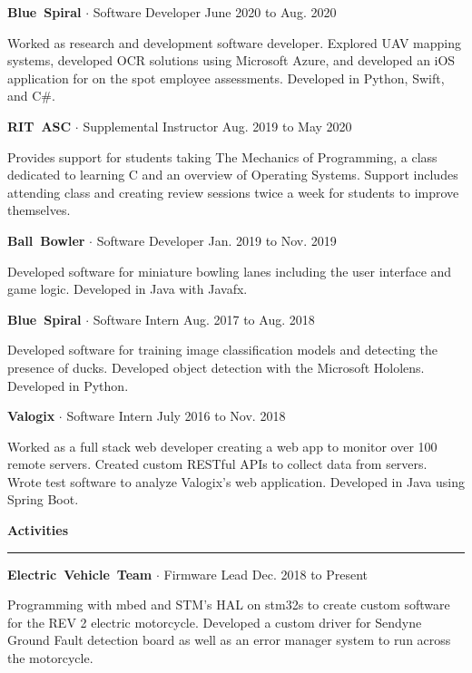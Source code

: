 \documentclass{article}
\newcommand{\rSection}[1] {
  \textcolor{header-blue} {
    \textbf{{\fontsize{0.5cm}{0.45cm}\selectfont \hbox{#1}}} \\
    \rule{0.30\textwidth}{0.1cm}
  }
}
\newcommand{\rSubSubSection}[1] {
  \textbf{{\fontsize{0.35cm}{0.45cm}\selectfont \hbox{#1}}}
}
\begin{document}
\rSubSubSection{Blue Spiral} $ \cdot $ Software Developer \hfill June 2020 to Aug. 2020 \par
Worked as research and development software developer. Explored UAV mapping systems, developed OCR solutions
using Microsoft Azure, and developed an iOS application for on the spot employee assessments. Developed in
Python, Swift, and C\#. \par \bigskip

\rSubSubSection{RIT ASC} $ \cdot $ Supplemental Instructor \hfill Aug. 2019 to May 2020 \par
Provides support for students taking The Mechanics of Programming, a class dedicated to learning C and an overview of Operating
Systems. Support includes attending class and creating review sessions twice a week for students to improve themselves. \par \bigskip

\rSubSubSection{Ball Bowler} $ \cdot $ Software Developer \hfill Jan. 2019 to Nov. 2019 \par
Developed software for miniature bowling lanes including the user interface and game logic. Developed in Java with Javafx. \par \bigskip

\rSubSubSection{Blue Spiral} $ \cdot $ Software Intern \hfill Aug. 2017 to Aug. 2018 \par
Developed software for training image classification models and detecting the presence of ducks. Developed object
detection with the Microsoft Hololens. Developed in Python. \par \bigskip

\rSubSubSection{Valogix} $ \cdot $ Software Intern \hfill July 2016 to Nov. 2018 \par
Worked as a full stack web developer creating a web app to monitor over 100 remote servers. Created custom RESTful APIs to collect
data from servers. Wrote test software to analyze Valogix's web application. Developed in Java using Spring Boot. \par

\rSection{Activities} \par

\rSubSubSection{Electric Vehicle Team} $ \cdot $ Firmware Lead \hfill Dec. 2018 to Present \par
Programming with mbed and STM's HAL on stm32s to create custom software for the REV 2 electric motorcycle. Developed a custom driver
for Sendyne Ground Fault detection board as well as an error manager system to run across the motorcycle. \par \bigskip
\end{document}
